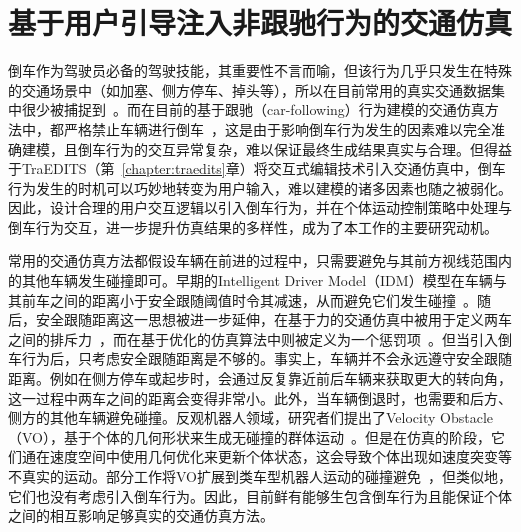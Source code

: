 
\chapter{基于用户引导注入非跟驰行为的交通仿真}
\label{chapter:reversing}


倒车作为驾驶员必备的驾驶技能，其重要性不言而喻，但该行为几乎只发生在特殊的交通场景中（如加塞、侧方停车、掉头等），所以在目前常用的真实交通数据集中很少被捕捉到~\cite{alexiadis2004next, apollosim}。而在目前的基于跟驰（car-following）行为建模的交通仿真方法中，都严格禁止车辆进行倒车~\cite{van2015genealogy, chao2020survey}，这是由于影响倒车行为发生的因素难以完全准确建模，且倒车行为的交互异常复杂，难以保证最终生成结果真实与合理。但得益于TraEDITS（第~\ref{chapter:traedits}章）将交互式编辑技术引入交通仿真中，倒车行为发生的时机可以巧妙地转变为用户输入，难以建模的诸多因素也随之被弱化。因此，设计合理的用户交互逻辑以引入倒车行为，并在个体运动控制策略中处理与倒车行为交互，进一步提升仿真结果的多样性，成为了本工作的主要研究动机。


常用的交通仿真方法都假设车辆在前进的过程中，只需要避免与其前方视线范围内的其他车辆发生碰撞即可。早期的Intelligent Driver Model（IDM）模型在车辆与其前车之间的距离小于安全跟随阈值时令其减速，从而避免它们发生碰撞~\cite{treiber2000congested-idm}。随后，安全跟随距离这一思想被进一步延伸，在基于力的交通仿真中被用于定义两车之间的排斥力~\cite{chao2019force, chao2021calibrated}，而在基于优化的仿真算法中则被定义为一个惩罚项~\cite{wilkie2013flow, chao2017realistic, ren2019heter, son2022differentiable}。但当引入倒车行为后，只考虑安全跟随距离是不够的。事实上，车辆并不会永远遵守安全跟随距离。例如在侧方停车或起步时，会通过反复靠近前后车辆来获取更大的转向角，这一过程中两车之间的距离会变得非常小。此外，当车辆倒退时，也需要和后方、侧方的其他车辆避免碰撞。反观机器人领域，研究者们提出了Velocity Obstacle（VO），基于个体的几何形状来生成无碰撞的群体运动~\cite{fiorini1998motion, van2008reciprocal, van2011reciprocal}。但是在仿真的阶段，它们通在速度空间中使用几何优化来更新个体状态，这会导致个体出现如速度突变等不真实的运动。部分工作将VO扩展到类车型机器人运动的碰撞避免~\cite{ma2018efficient, luo2022gamma}，但类似地，它们也没有考虑引入倒车行为。因此，目前鲜有能够生包含倒车行为且能保证个体之间的相互影响足够真实的交通仿真方法。


